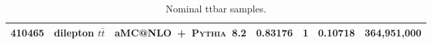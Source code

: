 \begin{table}[!htb]
{\begin{tabular}{rllS[table-format=3.2]lS[table-format=3.2]r}
      410465 & dilepton    $t\bar{t}$         & aMC@NLO~+~\textsc{Pythia}~8.2 & 0.83176 & 1 & 0.10718 & 364,951,000  \\  %
      \bottomrule
    \end{tabular}
  }
  \caption{Nominal ttbar samples.}
  \label{tab:ttbar-nominal}
\end{table}


